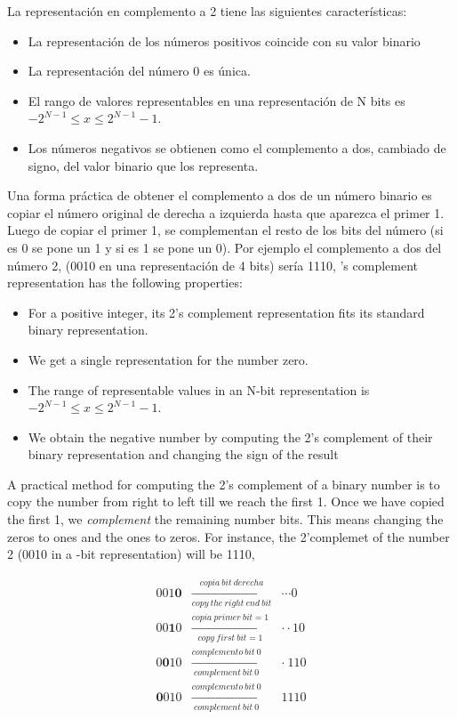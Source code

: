 \begin{paracol}{2}
 La representación en complemento a 2 tiene las siguientes características:
 \begin{itemize}
 \item La representación de los números positivos coincide con su valor binario
 \item La representación del número 0 es única.
 \item El rango de valores representables en una representación de N bits es $-2^{N-1} \le x \le  2^{N-1}-1$.
 \item Los números negativos se obtienen como el complemento a dos, cambiado de signo,  del valor binario que los representa. 
 \end{itemize}

Una forma práctica de obtener el complemento a dos de un número binario es copiar el número original de  derecha a izquierda hasta que aparezca el primer 1. Luego de copiar el primer 1, se complementan el resto de los bits del número (si es 0 se pone un 1 y si es 1 se pone un 0). Por ejemplo el complemento a dos del número 2, (0010 en una representación de 4 bits) sería 1110,
's complement representation has the following properties:
 \begin{itemize}
     \item For a positive integer, its 2's complement representation fits its standard binary representation.
     \item We get a single representation for the number zero.
     \item The range of representable values in an N-bit representation is $-2^{N-1} \le x \le  2^{N-1}-1$.
     \item We obtain the negative number by computing the 2's complement of their binary representation and changing the sign of the result
 \end{itemize}
A practical method for computing the 2's complement of a binary number is to copy the number from right to left till we reach the first 1. Once we have copied the first 1, we \emph{complement} the remaining number bits. This means changing the zeros to ones and the ones to zeros. For instance, the 2'complemet of the number 2 (0010 in a -bit representation) will be 1110, 

\end{paracol}

\begin{eqnarray*}
001\mathbf{0} & \xrightarrow[copy\ the\ right\ end\ bit]{copia\  bit\ derecha }& \cdots 0 \\
00\mathbf{1}0 & \xrightarrow[copy\ first\ bit=1]{copia\ primer\ bit = 1}& \cdot \cdot 10\\ 
0 \mathbf{0}10& \xrightarrow[complement\ bit\ 0]{complemento\ bit\  0} &\cdot  \ 110\\
 \mathbf{0}010& \xrightarrow[complement\ bit\ 0]{complemento\ bit\ 0} &1110
\end{eqnarray*} 

